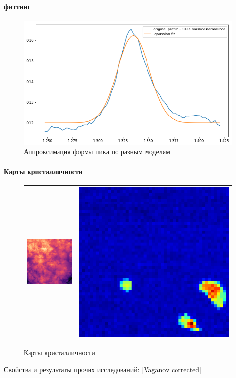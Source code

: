     \paragraph{фиттинг}

\begin{figure}
    \centering
    \includegraphics[width=\linewidth]{fig/gauss-fit.png}
    \caption{Аппроксимация формы пика по разным моделям}
    \label{fig:my_label}
\end{figure}
	
	\paragraph{Карты кристалличности}
	
	\begin{figure}[ht]\center
\begin{tabular}{cc}
\includegraphics[width=0.5\linewidth]{fig/map-1.png}
&
\includegraphics[width=0.5\linewidth]{fig/map-2.png}
\end{tabular}
\caption{Карты кристалличности}
\end{figure}
	
	

	
	
	
	Свойства и результаты прочих исследований:
	[Vaganov corrected]